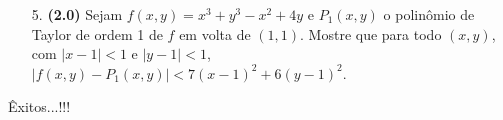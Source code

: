 \documentclass[oneside,a4paper,12pt]{article}
\begin{document}
\begin{itemize}
\item[5.]\textbf{(2.0)} Sejam $f(x,y)=x^{3}+y^{3}-x^{2}+4y$ e $P_{1}(x,y)$ o polinômio de Taylor de ordem 1 de $f$ em volta de $(1,1)$. Mostre que para todo $(x,y)$, com $|x-1|<1$ e $|y-1|<1$, $\left|f(x,y)-P_{1}(x,y)\right|<7(x-1)^{2}+6(y-1)^{2}$. 
\end{itemize}
	\flushbottom
	\flushright
     Êxitos...!!!
\end{document}
